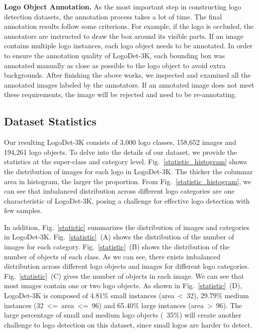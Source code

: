 \documentclass[journal]{IEEEtran}
\begin{document}
\textbf{Logo Object Annotation.} As the most important step in constructing logo detection datasets, the annotation process takes a lot of time. The final annotation results follow some criterions. For example, if the logo is occluded, the annotators are instructed to draw the box around its visible parts. If an image contains multiple logo instances, each logo object needs to be annotated. In order to ensure the annotation quality of LogoDet-3K, each bounding box was annotated manually as close as possible to the logo object to avoid extra backgrounds. After finishing the above works, we inspected and examined all the annotated images labeled by the annotators. If an annotated image does not meet these requirements, the image will be rejected and need to be re-annotating.


\subsection{Dataset Statistics}
Our resulting LogoDet-3K consists of 3,000 logo classes, 158,652 images and 194,261 logo objects. To delve into the details of our dataset, we provide the statistics at the super-class and category level. Fig.~\ref{statistic_histogram} shows the distribution of images for each logo in LogoDet-3K. The thicker the columnar area in histogram, the larger the proportion. From Fig.~\ref{statistic_histogram}, we can see that imbalanced distribution across different logo categories are one characteristic of LogoDet-3K, posing a challenge for effective logo detection with few samples.

In addition, Fig.~\ref{statistic} summarizes the distribution of images and categories in LogoDet-3K. Fig.~\ref{statistic}~(A) shows the distribution of the number of images for each category. Fig.~\ref{statistic}~(B) shows the distribution of the number of objects of each class. As we can see,  there exists imbalanced distribution across different logo objects and images for different logo categories. Fig.~\ref{statistic}~(C) gives the number of objects in each image. We can see that most images contain  one or two logo objects. As shown in Fig.~\ref{statistic}~(D), LogoDet-3K is composed of  4.81\% small instances (area~\textless~32), 29.79\% medium instances (32~\textless=~area~\textless=~96) and 65.40\% large instances (area~\textgreater~96). The large percentage of  small and medium logo objects (~35\%) will create another challenge to logo detection on this dataset, since small logos are harder to detect.
\end{document}
